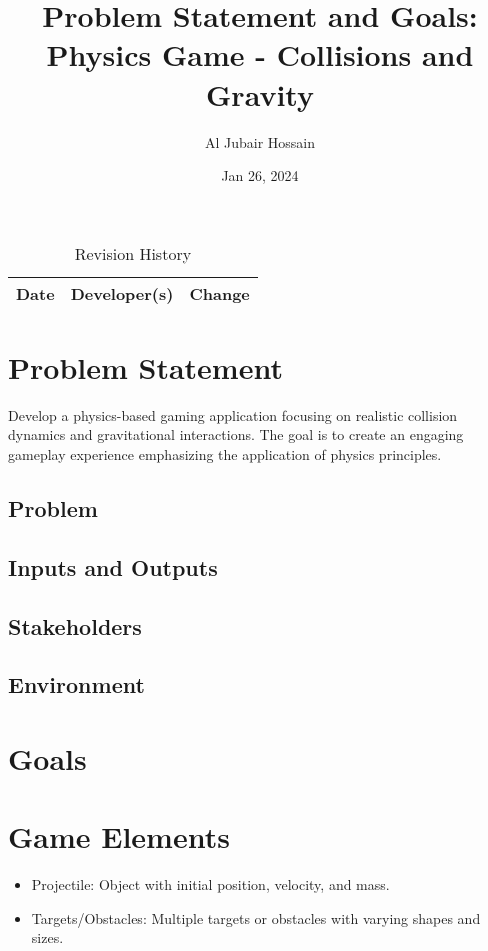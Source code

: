 \documentclass{article}
\title{Problem Statement and Goals: Physics Game - Collisions and Gravity}
\author{Al Jubair Hossain} %
\date{Jan 26, 2024} %
\begin{document}
\maketitle

\begin{table}[hp]
\caption{Revision History} \label{TblRevisionHistory}
\begin{tabularx}{\textwidth}{llX}
\toprule
\textbf{Date} & \textbf{Developer(s)} & \textbf{Change}\\
\midrule
\bottomrule
\end{tabularx}
\end{table}

\section{Problem Statement}
Develop a physics-based gaming application focusing on realistic collision dynamics and gravitational interactions. The goal is to create an engaging gameplay experience emphasizing the application of physics principles.

\subsection{Problem}

\subsection{Inputs and Outputs}

\subsection{Stakeholders}

\subsection{Environment}

\section{Goals}

\section{Game Elements}
\begin{itemize}
    \item Projectile: Object with initial position, velocity, and mass.
    \item Targets/Obstacles: Multiple targets or obstacles with varying shapes and sizes.
\end{itemize}
\end{document}
